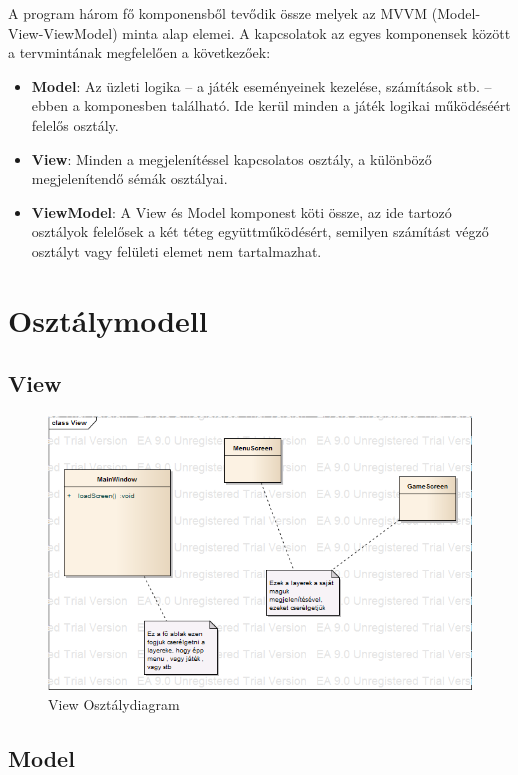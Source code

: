 \documentclass[a4paper,12pt]{report}
\begin{document}
A program három fő komponensből tevődik össze melyek az MVVM (Model-View-ViewModel) minta alap elemei. A kapcsolatok az egyes komponensek között a tervmintának megfelelően a következőek:
\begin{itemize}
\item {\bf Model}: Az üzleti logika – a játék eseményeinek kezelése, számítások stb. – ebben a komponesben található. Ide kerül minden a játék logikai működéséért felelős osztály.
\item {\bf View}: Minden a megjelenítéssel kapcsolatos osztály, a különböző megjelenítendő sémák osztályai.
\item {\bf ViewModel}: A View és Model komponest köti össze, az ide tartozó osztályok felelősek a két téteg együttműködésért, semilyen számítást végző osztályt vagy felületi elemet nem tartalmazhat.
\end{itemize}
 
\section{Osztálymodell}

\subsection{View}

\begin{figure}[hbtp]
\centering
\includegraphics[width=1\textwidth]{ViewClass.png}
\caption{View Osztálydiagram}
\label{fig:vc}
\end{figure}

\subsection{Model}
\end{document}
